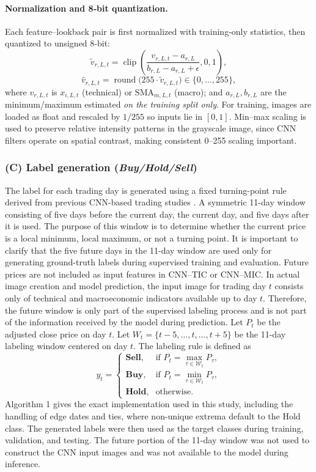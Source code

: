 \paragraph{Normalization and 8‑bit quantization.}
Each feature–lookback pair is first normalized with training‑only statistics, then quantized to unsigned 8‑bit:
\[
\tilde{v}_{r,L,t} = \operatorname{clip}\!\left(\frac{v_{r,L,t} - a_{r,L}}{b_{r,L} - a_{r,L} + \epsilon}, 0, 1\right),
\]
\[
\widehat{v}_{r,L,t} = \operatorname{round}\!\big(255 \cdot \tilde{v}_{r,L,t}\big) \in \{0,\ldots,255\},
\]
where $v_{r,L,t}$ is $x_{i,L,t}$ (technical) or $\mathrm{SMA}_{m,L,t}$ (macro); and $a_{r,L}, b_{r,L}$ are the minimum/maximum estimated \emph{on the training split only}. For training, images are loaded as float and rescaled by $1/255$ so inputs lie in $[0,1]$. Min–max scaling is used to preserve relative intensity patterns in the grayscale image, since CNN filters operate on spatial contrast, making consistent 0–255 scaling important.


\subsubsection*{(C) Label generation (\textit{Buy/Hold/Sell})}
The label for each trading day is generated using a fixed turning-point rule derived from previous CNN-based trading studies \cite{maratkhan2021deep}. 
A symmetric 11-day window consisting of five days before the current day, the current day, and five days after it is used. 
The purpose of this window is to determine whether the current price is a local minimum, local maximum, or not a turning point. 
It is important to clarify that the five future days in the 11-day window are used only for generating ground-truth labels during supervised training and evaluation. 
Future prices are not included as input features in CNN--TIC or CNN--MIC. 
In actual image creation and model prediction, the input image for trading day $t$ consists only of technical and macroeconomic indicators available up to day $t$. 
Therefore, the future window is only part of the supervised labeling process and is not part of the information received by the model during prediction.
Let $P_t$ be the adjusted close price on day $t$. 
Let $W_t = \{t-5,\ldots,t,\ldots,t+5\}$ be the 11-day labeling window centered on day $t$. 
The labeling rule is defined as
\begin{equation}
	y_t =
	\begin{cases}
		\textbf{Sell}, & \text{if } P_t = \max\limits_{\tau \in \mathcal{W}_t} P_\tau,\\[4pt]
		\textbf{Buy},  & \text{if } P_t = \min\limits_{\tau \in \mathcal{W}_t} P_\tau,\\[4pt]
		\textbf{Hold}, & \text{otherwise.}
	\end{cases}
	\label{eq:label}
\end{equation}
Algorithm 1 gives the exact implementation used in this study, including the handling of edge dates and ties, where non-unique extrema default to the Hold class. 
The generated labels were then used as the target classes during training, validation, and testing. 
The future portion of the 11-day window was not used to construct the CNN input images and was not available to the model during inference.

